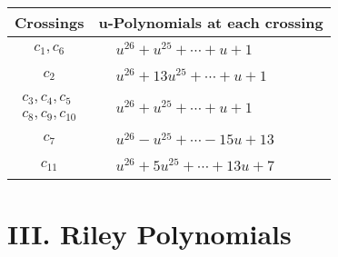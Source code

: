 \documentclass[1p]{elsarticle_modified}
\theoremstyle{definition}
\begin{document}
\begin{tabular}{m{50pt}|m{274pt}}
Crossings & \hspace{64pt}u-Polynomials at each crossing \\
\hline $$\begin{aligned}c_{1},c_{6}\end{aligned}$$&$\begin{aligned}
&u^{26}+u^{25}+\cdots+u+1
\end{aligned}$\\
\hline $$\begin{aligned}c_{2}\end{aligned}$$&$\begin{aligned}
&u^{26}+13 u^{25}+\cdots+u+1
\end{aligned}$\\
\hline $$\begin{aligned}c_{3},c_{4},c_{5}\\c_{8},c_{9},c_{10}\end{aligned}$$&$\begin{aligned}
&u^{26}+u^{25}+\cdots+u+1
\end{aligned}$\\
\hline $$\begin{aligned}c_{7}\end{aligned}$$&$\begin{aligned}
&u^{26}- u^{25}+\cdots-15 u+13
\end{aligned}$\\
\hline $$\begin{aligned}c_{11}\end{aligned}$$&$\begin{aligned}
&u^{26}+5 u^{25}+\cdots+13 u+7
\end{aligned}$\\
\hline
\end{tabular}\newpage\renewcommand{\arraystretch}{1}
\centering \section*{ III. Riley Polynomials}
\end{document}
